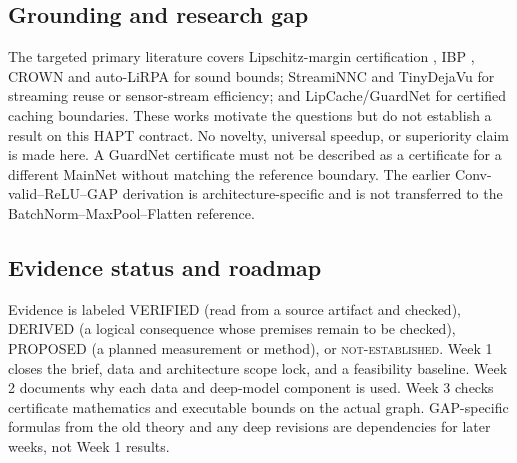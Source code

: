\documentclass[11pt,a4paper]{article}
\begin{document}
\subsection{Grounding and research gap}
The targeted primary literature covers Lipschitz-margin certification
\cite{lmt}, IBP \cite{ibp}, CROWN and auto-LiRPA \cite{crown,lirpa} for sound
bounds; StreamiNNC and TinyDejaVu \cite{streaminnc,tiny} for streaming reuse
or sensor-stream efficiency; and LipCache/GuardNet \cite{lipcache} for certified caching
boundaries. These works motivate the questions but do not establish a result
on this HAPT contract. No novelty, universal speedup, or superiority claim is
made here. A GuardNet certificate must not be described as a certificate for a
different MainNet without matching the reference boundary. The earlier
Conv-valid--ReLU--GAP derivation is architecture-specific and is not
transferred to the BatchNorm--MaxPool--Flatten reference.

\subsection{Evidence status and roadmap}
Evidence is labeled VERIFIED (read from a source artifact and checked),
DERIVED (a logical consequence whose premises remain to be checked), PROPOSED
(a planned measurement or method), or \textsc{not-established}. Week 1 closes the
brief, data and architecture scope lock, and a feasibility baseline. Week 2
documents why each data and deep-model component is used. Week 3 checks
certificate mathematics and executable bounds on the actual graph. GAP-specific
formulas from the old theory and any deep revisions are dependencies for later
weeks, not Week 1 results.
\end{document}
